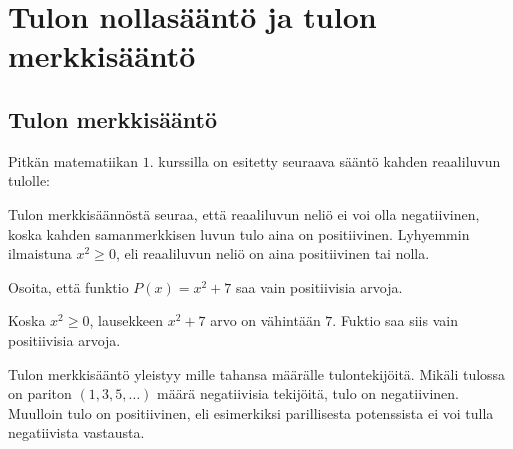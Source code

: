 \section{Tulon nollasääntö ja tulon merkkisääntö}

\subsection*{Tulon merkkisääntö}

Pitkän matematiikan $1$. kurssilla on esitetty seuraava sääntö kahden reaaliluvun tulolle:


Tulon merkkisäännöstä seuraa, että reaaliluvun neliö ei voi olla negatiivinen, koska kahden samanmerkkisen luvun tulo aina on positiivinen. Lyhyemmin ilmaistuna $x^2 \geq 0$, eli reaaliluvun neliö on aina  positiivinen tai nolla.

\begin{esimerkki}
Osoita, että funktio $P(x)=x^2+7$ saa vain positiivisia arvoja.
    \begin{esimratk}
	Koska $x^2 \geq 0$, lausekkeen $x^2+7$ arvo on vähintään $7$. Fuktio saa siis
	vain positiivisia arvoja.
    \end{esimratk}
\end{esimerkki}

Tulon merkkisääntö yleistyy mille tahansa määrälle tulontekijöitä. Mikäli tulossa on pariton $(1, 3, 5, \ldots)$ määrä negatiivisia tekijöitä, tulo on negatiivinen. Muulloin tulo on positiivinen, eli esimerkiksi parillisesta potenssista ei voi tulla negatiivista vastausta.

